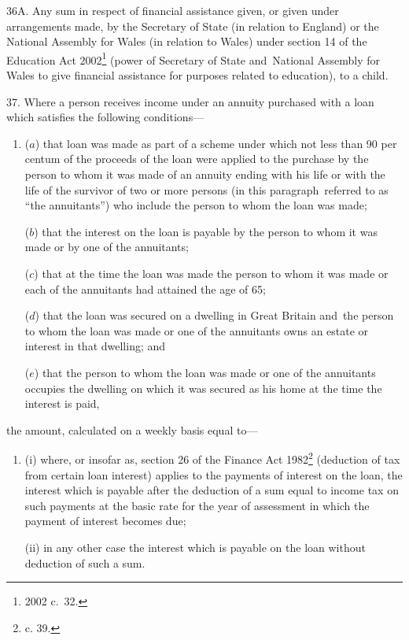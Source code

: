 \documentclass[12pt,a4paper]{article}
\begin{document}
36A.  Any sum in respect of financial assistance given, or given under arrangements made, by the Secretary of State (in relation to England) or the National Assembly for Wales (in relation to Wales) under section 14 of the Education Act 2002\footnote{2002 c.\ 32.} (power of Secretary of State and~National Assembly for Wales to give financial assistance for purposes related to education), to a child.


\medskip

37.  Where a person receives income under an annuity purchased with a loan which satisfies the following conditions—
\begin{enumerate}\item[]
($a$) that loan was made as part of a scheme under which not less than 90 per centum of the proceeds of the loan were applied to the purchase by the person to whom it was made of an annuity ending with his life or with the life of the survivor of two or more persons (in this paragraph~referred to as “the annuitants”) who include the person to whom the loan was made;

($b$) that the interest on the loan is payable by the person to whom it was made or by one of the annuitants;

($c$) that at the time the loan was made the person to whom it was made or each of the annuitants had attained the age of 65;

($d$) that the loan was secured on a dwelling in Great Britain and~the person to whom the loan was made or one of the annuitants owns an estate or interest in that dwelling; and

($e$) that the person to whom the loan was made or one of the annuitants occupies the dwelling on which it was secured as his home at the time the interest is paid,
\end{enumerate}
the amount, calculated on a weekly basis equal to—
\begin{enumerate}\item[]
(i) where, or insofar as, section 26 of the Finance Act 1982\footnote{ c. 39.} (deduction of tax from certain loan interest) applies to the payments of interest on the loan, the interest which is payable after the deduction of a sum equal to income tax on such payments at the basic rate for the year of assessment in which the payment of interest becomes due;

(ii) in any other case the interest which is payable on the loan without deduction of such a sum.
\end{enumerate}
\end{document}
